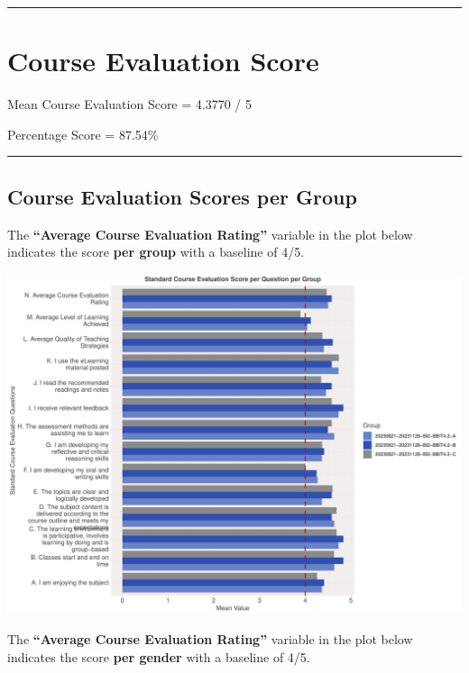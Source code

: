 \documentclass[
]{article}
\begin{document}
\newpage

\begin{center}\rule{0.5\linewidth}{0.5pt}\end{center}

\section{Course Evaluation Score}\label{course-evaluation-score}

Mean Course Evaluation Score = 4.3770 / 5

Percentage Score = 87.54\%

\begin{center}\rule{0.5\linewidth}{0.5pt}\end{center}

\subsection{Course Evaluation Scores per
Group}\label{course-evaluation-scores-per-group}

The \textbf{``Average Course Evaluation Rating''} variable in the plot
below indicates the score \textbf{per group} with a baseline of 4/5.

\includegraphics{AnalysisOfCourseEvaluation-Notebook_files/figure-latex/VisualizationsForCourseEvaluationResultsperClassGroup-1.pdf}

\newpage

The \textbf{``Average Course Evaluation Rating''} variable in the plot
below indicates the score \textbf{per gender} with a baseline of 4/5.
\end{document}

